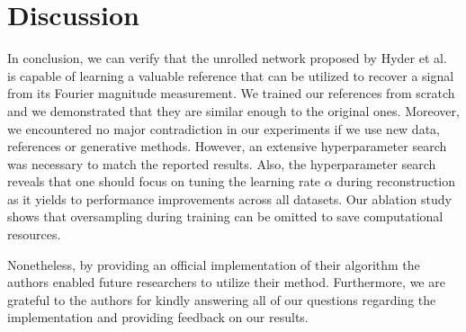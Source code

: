 \section{Discussion}


In conclusion, we can verify that the unrolled network proposed by Hyder et al.~\cite{hyder2020solving} is capable of learning a valuable reference that can be utilized to recover a signal from its Fourier magnitude measurement. We trained our references from scratch and we demonstrated that they are similar enough to the original ones. Moreover, we encountered no major contradiction in our experiments if we use new data, references or generative methods.
However, an extensive hyperparameter search was necessary to match the reported results.  Also, the hyperparameter search reveals that one should focus on tuning the learning rate $\alpha$ during reconstruction as it yields to performance improvements across all datasets. Our ablation study shows that oversampling during training can be omitted to save computational resources.

Nonetheless, by providing an official implementation of their algorithm the authors enabled future researchers to utilize their method. Furthermore, we are grateful to the authors for kindly answering all of our questions regarding the implementation and providing feedback on our results.


%
%

